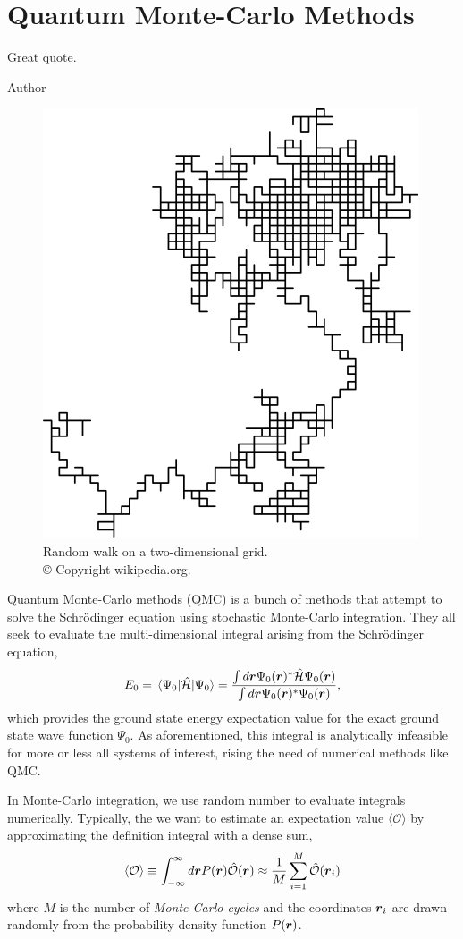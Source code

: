 \chapter{Quantum Monte-Carlo Methods} \label{chp:methods}
\epigraph{Great quote.}{Author}
\begin{figure}[H]
	\centering
	\includegraphics[scale=0.4]{Images/random_walk.png}
	\caption{Random walk on a two-dimensional grid.\\ © Copyright wikipedia.org.}
\end{figure}

Quantum Monte-Carlo methods (QMC) is a bunch of methods that attempt to solve the Schrödinger equation using stochastic Monte-Carlo integration. They all seek to evaluate the multi-dimensional integral arising from the Schrödinger equation,
\begin{equation}
E_0= \mel{\Psi_0}{\hat{\mathcal{H}}}{\Psi_0}= \frac{\int d\bs{r}\Psi_0(\bs{r})^*\hat{\mathcal{H}}\Psi_0(\bs{r})}{\int d\bs{r}\Psi_0(\bs{r})^*\Psi_0(\bs{r})},
\label{eq:schrodingergroundstate}
\end{equation}
which provides the ground state energy expectation value for the exact ground state wave function $\Psi_0$. As aforementioned, this integral is analytically infeasible for more or less all systems of interest, rising the need of numerical methods like QMC.

In Monte-Carlo integration, we use random number to evaluate integrals numerically. Typically, the we want to estimate an expectation value $\langle\mathcal{O}\rangle$ by approximating the definition integral with a dense sum,
\begin{equation}
\langle \mathcal{O}\rangle\equiv\int_{-\infty}^{\infty}d\boldsymbol{{r}}P(\boldsymbol{{r}})\hat{\mathcal{O}}(\boldsymbol{{r}})\approx\frac{1}{M}\sum_{i=1}^M\hat{\mathcal{O}}(\boldsymbol{{r}}_i)
\label{eq:montecarlointegration}
\end{equation}
where $M$ is the number of \textit{Monte-Carlo cycles} and the coordinates $\boldsymbol{{r}}_i$ are drawn randomly from the probability density function $P(\boldsymbol{{r}})$.

